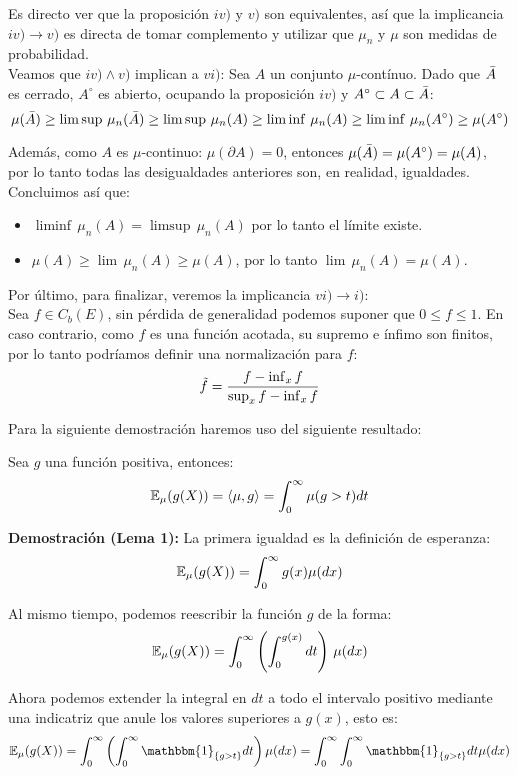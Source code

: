 Es directo ver que la proposición $iv)$ y $v)$ son equivalentes, así que la implicancia $iv) \rightarrow v)$ es directa de tomar complemento y utilizar que $\mu_n$ y $\mu$ son medidas de probabilidad.\\ 

Veamos que $iv)\land v)$ implican a $vi)$: Sea $A$ un conjunto $\mu$-contínuo. Dado que $\Bar{A}$ es cerrado, $A^{\circ}$ es abierto, ocupando la proposición $iv)$ y $A^{\circ} \subset A\subset \Bar{A}$:
\[\mu(\Bar{A}) \geq \limsup\,\mu_n(\Bar{A}) \geq \limsup\,\mu_n(A)\geq \liminf\,\mu_n(A) \geq \liminf\,\mu_n(A^{\circ})\geq \mu(A^{\circ})\]

Además, como $A$ es $\mu$-continuo: $\mu(\partial A) = 0$, entonces $\mu(\Bar{A}) = \mu(A^{\circ}) = \mu(A)$, por lo tanto todas las desigualdades anteriores son, en realidad, igualdades. Concluimos así que:
\begin{itemize}
    \item $\liminf\,\mu_n(A) = \limsup\,\mu_n(A)$ por lo tanto el límite existe.
    \item $\mu(A)\geq \lim\,\mu_n(A)\geq \mu(A)$, por lo tanto $\lim\,\mu_n(A) = \mu(A)$.
\end{itemize}

Por último, para finalizar, veremos la implicancia $vi)\rightarrow i)$:\\

Sea $f\in C_b(E)$, sin pérdida de generalidad podemos suponer que $0\leq f\leq 1$. En caso contrario, como $f$ es una función acotada, su supremo e ínfimo son finitos, por lo tanto podríamos definir una normalización para $f$:
\[\Tilde{f} = \frac{f - \inf_x f}{\sup_x f - \inf_x f}\]

Para la siguiente demostración haremos uso del siguiente resultado:
\begin{lem} Sea $g$ una función positiva, entonces:
    \begin{equation}
        \mathbb E_{\mu}(g(X)) = \langle\mu,g\rangle = \int_0^{\infty}\mu(g>t)dt
    \end{equation}
\end{lem}
\textbf{Demostración (Lema 1):} La primera igualdad es la definición de esperanza:
\[\mathbb E_{\mu}(g(X)) = \int_{0}^{\infty}g(x)\mu(dx)\]

Al mismo tiempo, podemos reescribir la función $g$ de la forma:
\[\mathbb E_{\mu}(g(X)) = \int_{0}^{\infty}\left(\int_{0}^{g(x)}dt\right)\,\mu(dx)\]

Ahora podemos extender la integral en $dt$ a todo el intervalo positivo mediante una indicatriz que anule los valores superiores a $g(x)$, esto es:
\[\E_{\mu}(g(X)) = \int_{0}^{\infty}\left(\int_{0}^{\infty}\mathbbm{1}_{\{g>t\}}dt\right)\mu(dx) = \int_{0}^{\infty}\int_{0}^{\infty}\mathbbm{1}_{\{g>t\}}dt\mu(dx)\]


